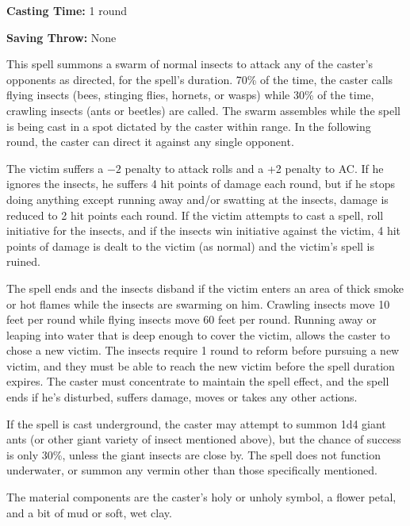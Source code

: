 \begin{multicols}{2}
\begin{minipage}{\columnwidth}
\noindent \textbf{Casting Time:} 1 round

\noindent \textbf{Saving Throw:} None

\end{minipage}

This spell summons a swarm of normal insects to attack any of the caster's opponents as directed, for the spell's duration.  70\% of the time, the caster calls flying insects (bees, stinging flies, hornets, or wasps) while 30\% of the time, crawling insects (ants or beetles) are called.  The swarm assembles while the spell is being cast in a spot dictated by the caster within range.  In the following round, the caster can direct it against any single opponent.

The victim suffers a $-2$ penalty to attack rolls and a +2 penalty to AC.  If he ignores the insects, he suffers 4 hit points of damage each round, but if he stops doing anything except running away and/or swatting at the insects, damage is reduced to 2 hit points each round.  If the victim attempts to cast a spell, roll initiative for the insects, and if the insects win initiative against the victim, 4 hit points of damage is dealt to the victim (as normal) and the victim's spell is ruined.

The spell ends and the insects disband if the victim enters an area of thick smoke or hot flames while the insects are swarming on him.  Crawling insects move 10 feet per round while flying insects move 60 feet per round.  Running away or leaping into water that is deep enough to cover the victim, allows the caster to chose a new victim.  The insects require 1 round to reform before pursuing a new victim, and they must be able to reach the new victim before the spell duration expires.  The caster must concentrate to maintain the spell effect, and the spell ends if he's disturbed, suffers damage, moves or takes any other actions.

If the spell is cast underground, the caster may attempt to summon 1d4 giant ants (or other giant variety of insect mentioned above), but the chance of success is only 30\%, unless the giant insects are close by.  The spell does not function underwater, or summon any vermin other than those specifically mentioned.

The material components are the caster's holy or unholy symbol, a flower petal, and a bit of mud or soft, wet clay.

\vspace{1em}

\noindent
\begin{minipage}{\columnwidth}


\end{minipage}
\end{multicols}
